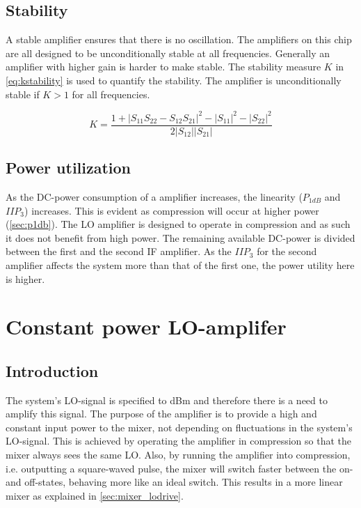 		\subsection{Stability}
			A stable amplifier ensures that there is no oscillation.\autocite{grosch99} The amplifiers on this chip are all designed to be unconditionally stable at all frequencies. Generally an amplifier with higher gain is harder to make stable. The stability measure $K$ in \autoref{eq:kstability} is used to quantify the stability. The amplifier is unconditionally stable if $K>1$ for all frequencies.
		
			\begin{equation}\label{eq:kstability}
				K=\frac{1+|S_{11}S_{22}-S_{12}S_{21}|^2-|S_{11}|^2-|S_{22}|^2}{2|S_{12}||S_{21}|}
			\end{equation}

		\subsection{Power utilization}\label{sec:power}
			As the DC-power consumption of a amplifier increases, the linearity ($P_{1dB}$ and $IIP_3$) increases. This is evident as compression will occur at higher power (\autoref{sec:p1db}). The LO amplifier is designed to operate in compression and as such it does not benefit from high power. The remaining available DC-power is divided between the first and the second IF amplifier. As the $IIP_3$ for the second amplifier affects the system more than that of the first one, the power utility here is higher.
			
	\section{Constant power LO-amplifer}\label{sec:lo_amp}
		\subsection{Introduction}
			The system's LO-signal is specified to \unit[-5--0]{dBm} and therefore there is a need to amplify this signal. The purpose of the amplifier is to provide a high and constant input power to the mixer, not depending on fluctuations in the system's LO-signal. This is achieved by operating the amplifier in compression so that the mixer always sees the same LO. Also, by running the amplifier into compression, i.e. outputting a square-waved pulse, the mixer will switch faster between the on- and off-states, behaving more like an ideal switch. This results in a more linear mixer as explained in \autoref{sec:mixer_lodrive}.\autocite{vice03} %
			


